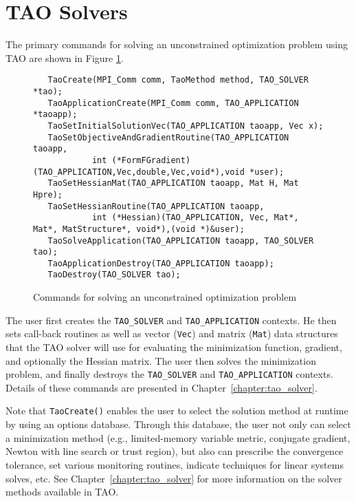 \section{TAO Solvers}

The primary commands for solving an unconstrained optimization problem
using TAO are shown in Figure \ref{fig:tao_commands}.
  
 
 
  

\begin{figure}[H]
\begin{verbatim}
   TaoCreate(MPI_Comm comm, TaoMethod method, TAO_SOLVER *tao); 
   TaoApplicationCreate(MPI_Comm comm, TAO_APPLICATION *taoapp); 
   TaoSetInitialSolutionVec(TAO_APPLICATION taoapp, Vec x);
   TaoSetObjectiveAndGradientRoutine(TAO_APPLICATION taoapp,
            int (*FormFGradient)(TAO_APPLICATION,Vec,double,Vec,void*),void *user);
   TaoSetHessianMat(TAO_APPLICATION taoapp, Mat H, Mat Hpre);
   TaoSetHessianRoutine(TAO_APPLICATION taoapp,
            int (*Hessian)(TAO_APPLICATION, Vec, Mat*, Mat*, MatStructure*, void*),(void *)&user);
   TaoSolveApplication(TAO_APPLICATION taoapp, TAO_SOLVER tao);
   TaoApplicationDestroy(TAO_APPLICATION taoapp);
   TaoDestroy(TAO_SOLVER tao);
\end{verbatim}
\caption{Commands for solving an unconstrained optimization problem
\label{fig:tao_commands}}
\end{figure}

\noindent
The user first creates the \texttt{TAO\_SOLVER} and
\texttt{TAO\_APPLICATION} contexts. He then sets call-back routines as
well as vector (\texttt{Vec}) and matrix (\texttt{Mat}) data
structures that the TAO solver will use for evaluating the
minimization function, gradient, and optionally the Hessian matrix.
The user then solves the minimization problem, and finally destroys
the \texttt{TAO\_SOLVER} and \texttt{TAO\_APPLICATION} contexts.
Details of these commands are presented in
Chapter~\ref{chapter:tao_solver}.

Note that \texttt{TaoCreate()} enables the user to select the solution
method at runtime by using an options database.  Through this
database, the user not only can select a minimization method (e.g.,
limited-memory variable metric, conjugate gradient, Newton with line
search or trust region), but also can prescribe the convergence
tolerance, set various monitoring routines, indicate techniques for
linear systems solves, etc.  See Chapter~\ref{chapter:tao_solver} for more 
information on the solver methods available in TAO.

